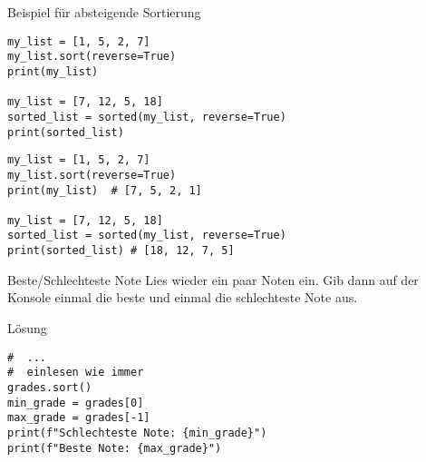 \begin{fragile}
\begin{exampleblock}{Beispiel für absteigende Sortierung}
\vspace{2pt}
\begin{overprint}
\begin{verbatim}
my_list = [1, 5, 2, 7]
my_list.sort(reverse=True)
print(my_list)  

my_list = [7, 12, 5, 18]
sorted_list = sorted(my_list, reverse=True)
print(sorted_list) 
\end{verbatim}
\begin{verbatim}
my_list = [1, 5, 2, 7]
my_list.sort(reverse=True)
print(my_list)  # [7, 5, 2, 1]

my_list = [7, 12, 5, 18]
sorted_list = sorted(my_list, reverse=True)
print(sorted_list) # [18, 12, 7, 5] 
\end{verbatim}
\end{overprint}
\end{exampleblock}
\end{fragile}


\begin{fragile}[Übung]
	
\begin{block}{Beste/Schlechteste Note}
\vspace{2pt}
Lies wieder ein paar Noten ein. Gib dann auf der Konsole einmal die beste und einmal die schlechteste Note aus. 
\end{block}	

\vspace{12pt}

\begin{solutionblock}{Lösung}
\begin{verbatim}
#  ...
#  einlesen wie immer
grades.sort()
min_grade = grades[0]
max_grade = grades[-1]
print(f"Schlechteste Note: {min_grade}")
print(f"Beste Note: {max_grade}")
\end{verbatim}
\end{solutionblock}
\end{fragile}

